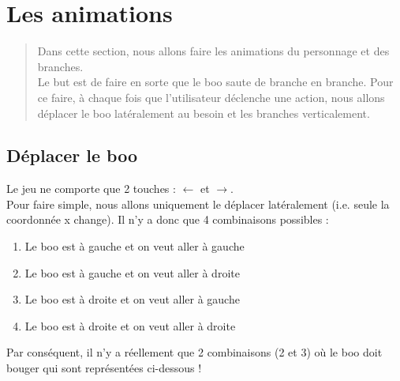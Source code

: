 \documentclass[french]{article}
\begin{document}
\section{Les animations}
	
\begin{abstract}
	Dans cette section, nous allons faire les animations du personnage et des branches.\\
	
	Le but est de faire en sorte que le boo saute de branche en branche. Pour ce faire, à chaque fois que l'utilisateur déclenche une action, nous allons déplacer le boo latéralement au besoin et les branches verticalement.  
\end{abstract}
	
\subsection{Déplacer le boo}	
	
Le jeu ne comporte que 2 touches : $\leftarrow$ et $\rightarrow$.\\ 

Pour faire simple, nous allons uniquement le déplacer latéralement (i.e. seule la coordonnée x change). Il n'y a donc que 4 combinaisons possibles :

\begin{enumerate}
	\item Le boo est à gauche et on veut aller à gauche
	\item Le boo est à gauche et on veut aller à droite
	\item Le boo est à droite et on veut aller à gauche
	\item Le boo est à droite et on veut aller à droite
\end{enumerate}	

Par conséquent, il n'y a réellement que 2 combinaisons (2 et 3) où le boo doit bouger qui sont représentées ci-dessous !
\end{document}
